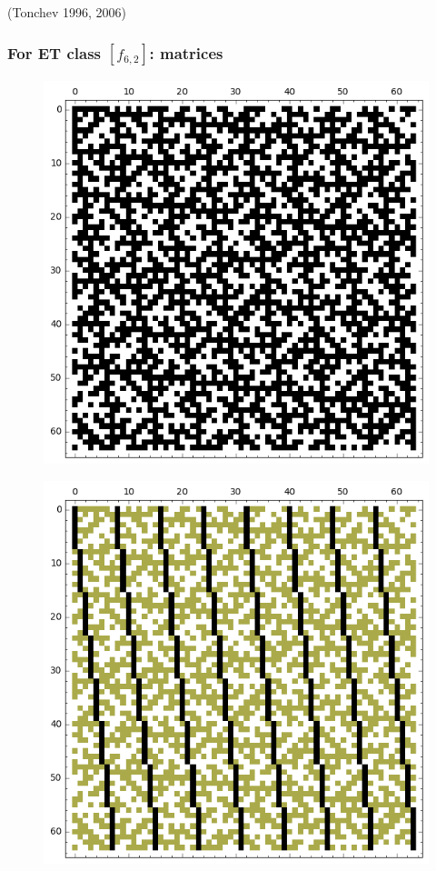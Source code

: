 \documentclass[pdf,sprung,slideColor,nocolorBG]{beamer}
\newenvironment{colortheme}[1]{
\def\ProvidesPackageRCS $##1${\relax}
\renewcommand{\ProcessOptions}{\relax}
\makeatletter

\makeatother
}{}
\newcommand{\slidecite}[1]{\tiny{(#1)}\normalsize{}}
\begin{document}
\begin{colortheme}{jubata}
\begin{frame}
\slidecite{Tonchev 1996, 2006}
\end{frame}
\begin{frame}
\frametitle{For ET class $[f_{6,2}]$: matrices}
\begin{figure}
\centering
\begin{minipage}{.48\textwidth}
  \centering
  \includegraphics[width=.9\linewidth]{../matrix_plot/re6_2_weight_class_matrix.png}
  \label{fig:6_2_weight_class_matrix}
\end{minipage}%
\begin{minipage}{.48\textwidth}
  \centering
  \includegraphics[width=.9\linewidth]{../matrix_plot/re6_2_bent_cayley_graph_index_matrix.png}

\end{minipage}
\end{figure}
\end{frame}
\end{colortheme}
\end{document}
